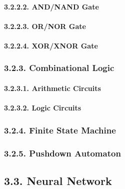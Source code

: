 \documentclass[
]{article}
\begin{document}
\hypertarget{andnand-gate}{%
\paragraph{3.2.2.2. AND/NAND Gate}\label{andnand-gate}}

\hypertarget{ornor-gate}{%
\paragraph{3.2.2.3. OR/NOR Gate}\label{ornor-gate}}

\hypertarget{xorxnor-gate}{%
\paragraph{3.2.2.4. XOR/XNOR Gate}\label{xorxnor-gate}}

\hypertarget{combinational-logic}{%
\subsubsection{3.2.3. Combinational Logic}\label{combinational-logic}}

\hypertarget{arithmetic-circuits}{%
\paragraph{3.2.3.1. Arithmetic Circuits}\label{arithmetic-circuits}}

\hypertarget{logic-circuits}{%
\paragraph{3.2.3.2. Logic Circuits}\label{logic-circuits}}

\hypertarget{finite-state-machine}{%
\subsubsection{3.2.4. Finite State Machine}\label{finite-state-machine}}

\hypertarget{pushdown-automaton}{%
\subsubsection{3.2.5. Pushdown Automaton}\label{pushdown-automaton}}

\hypertarget{neural-network}{%
\subsection{3.3. Neural Network}\label{neural-network}}
\end{document}
